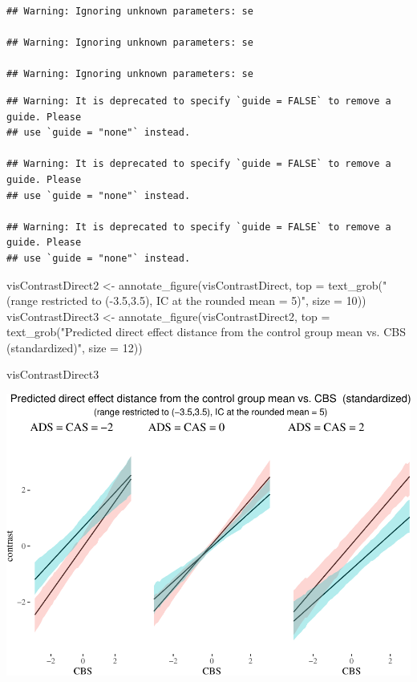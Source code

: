\documentclass[
  10pt,
  dvipsnames,enabledeprecatedfontcommands]{scrartcl}
\newenvironment{Shaded}{\begin{snugshade}}{\end{snugshade}}
\newcommand{\AttributeTok}[1]{\textcolor[rgb]{0.77,0.63,0.00}{#1}}
\newcommand{\DecValTok}[1]{\textcolor[rgb]{0.00,0.00,0.81}{#1}}
\newcommand{\FunctionTok}[1]{\textcolor[rgb]{0.00,0.00,0.00}{#1}}
\newcommand{\NormalTok}[1]{#1}
\newcommand{\OtherTok}[1]{\textcolor[rgb]{0.56,0.35,0.01}{#1}}
\newcommand{\StringTok}[1]{\textcolor[rgb]{0.31,0.60,0.02}{#1}}
\begin{document}
\begin{verbatim}
## Warning: Ignoring unknown parameters: se

## Warning: Ignoring unknown parameters: se

## Warning: Ignoring unknown parameters: se
\end{verbatim}

\begin{verbatim}
## Warning: It is deprecated to specify `guide = FALSE` to remove a guide. Please
## use `guide = "none"` instead.

## Warning: It is deprecated to specify `guide = FALSE` to remove a guide. Please
## use `guide = "none"` instead.

## Warning: It is deprecated to specify `guide = FALSE` to remove a guide. Please
## use `guide = "none"` instead.
\end{verbatim}

\begin{Shaded}
\begin{Highlighting}[]
\NormalTok{visContrastDirect2 }\OtherTok{\textless{}{-}} \FunctionTok{annotate\_figure}\NormalTok{(visContrastDirect, }
                                        \AttributeTok{top =} \FunctionTok{text\_grob}\NormalTok{(}\StringTok{"(range restricted to ({-}3.5,3.5), IC at the rounded mean = 5)"}\NormalTok{,}
                                                        \AttributeTok{size =} \DecValTok{10}\NormalTok{))}
\NormalTok{visContrastDirect3 }\OtherTok{\textless{}{-}} \FunctionTok{annotate\_figure}\NormalTok{(visContrastDirect2, }
                                        \AttributeTok{top =} \FunctionTok{text\_grob}\NormalTok{(}\StringTok{"Predicted direct effect distance from the control group mean vs. CBS  (standardized)"}\NormalTok{,}
                                                        \AttributeTok{size =} \DecValTok{12}\NormalTok{))}

\NormalTok{visContrastDirect3}
\end{Highlighting}
\end{Shaded}

\begin{center}\includegraphics[width=1\linewidth]{bayesianReport3_files/figure-latex/unnamed-chunk-18-1} \end{center}
\normalsize
\end{document}

